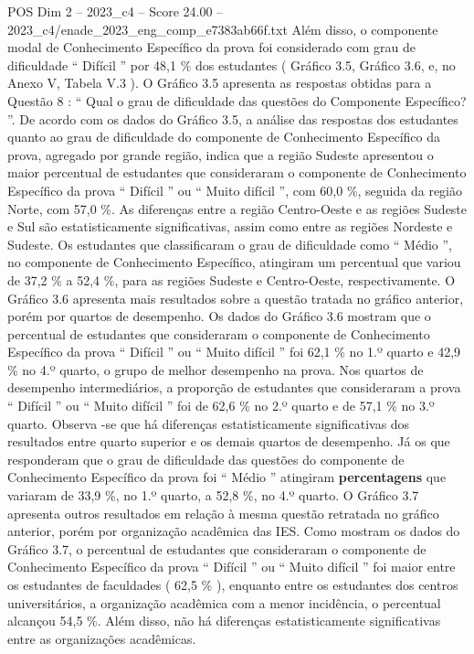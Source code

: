 \begin{textsample}{POS Dim 2 – 2023\_c4 – Score 24.00 – 2023\_c4/enade\_2023\_eng\_comp\_e7383ab66f.txt}
Além disso, o componente modal de Conhecimento Específico da prova foi considerado com grau de dificuldade “ Difícil ” por 48,1 \% dos estudantes ( Gráfico 3.5, Gráfico 3.6, e, no Anexo V, Tabela V.3 ).
O Gráfico 3.5 apresenta as respostas obtidas para a Questão 8 : “ Qual o grau de dificuldade das questões do Componente Específico? ”.
De acordo com os dados do Gráfico 3.5, a análise das respostas dos estudantes quanto ao grau de dificuldade do componente de Conhecimento Específico da prova, agregado por grande região, indica que a região Sudeste apresentou o maior percentual de estudantes que consideraram o componente de Conhecimento Específico da prova “ Difícil ” ou “ Muito difícil ”, com 60,0 \%, seguida da região Norte, com 57,0 \%.
As diferenças entre a região Centro-Oeste e as regiões Sudeste e Sul são estatisticamente significativas, assim como entre as regiões Nordeste e Sudeste.
Os estudantes que classificaram o grau de dificuldade como “ Médio ”, no componente de Conhecimento Específico, atingiram um percentual que variou de 37,2 \% a 52,4 \%, para as regiões Sudeste e Centro-Oeste, respectivamente.
O Gráfico 3.6 apresenta mais resultados sobre a questão tratada no gráfico anterior, porém por quartos de desempenho.
Os dados do Gráfico 3.6 mostram que o percentual de estudantes que consideraram o componente de Conhecimento Específico da prova “ Difícil ” ou “ Muito difícil ” foi 62,1 \% no 1.º quarto e 42,9 \% no 4.º quarto, o grupo de melhor desempenho na prova.
Nos quartos de desempenho intermediários, a proporção de estudantes que consideraram a prova “ Difícil ” ou “ Muito difícil ” foi de 62,6 \% no 2.º quarto e de 57,1 \% no 3.º quarto.
Observa -se que há diferenças estatisticamente significativas dos resultados entre quarto superior e os demais quartos de desempenho.
Já os que responderam que o grau de dificuldade das questões do componente de Conhecimento Específico da prova foi “ Médio ” atingiram \textbf{percentagens} que variaram de 33,9 \%, no 1.º quarto, a 52,8 \%, no 4.º quarto.
O Gráfico 3.7 apresenta outros resultados em relação à mesma questão retratada no gráfico anterior, porém por organização acadêmica das IES.
Como mostram os dados do Gráfico 3.7, o percentual de estudantes que consideraram o componente de Conhecimento Específico da prova “ Difícil ” ou “ Muito difícil ” foi maior entre os estudantes de faculdades ( 62,5 \% ), enquanto entre os estudantes dos centros universitários, a organização acadêmica com a menor incidência, o percentual alcançou 54,5 \%.
Além disso, não há diferenças estatisticamente significativas entre as organizações acadêmicas.

\end{textsample}
